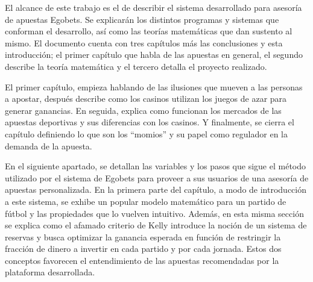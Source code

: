 El alcance de este trabajo es el de describir el sistema desarrollado para asesoría de apuestas Egobets. %
Se explicarán los distintos programas y sistemas que conforman el desarrollo, así como las teorías matemáticas que dan sustento al mismo. El documento cuenta con tres capítulos más las conclusiones y esta introducción; el primer capítulo que habla de las apuestas en general, el segundo describe la teoría matemática y el tercero detalla el proyecto realizado.

El primer capítulo, empieza hablando de las ilusiones que mueven a las personas a apostar, después describe como los casinos utilizan los juegos de azar para generar ganancias. En seguida, explica como funcionan los mercados de las apuestas deportivas y sus diferencias con los casinos. Y finalmente, se cierra el capítulo definiendo lo que son los ``momios'' y su papel como regulador en la demanda de la apuesta. 



En el siguiente apartado, se detallan las variables y los pasos que sigue el método utilizado por el sistema de Egobets para proveer a sus usuarios de una asesoría de apuestas personalizada. En la primera parte del capítulo, a modo de introducción a este sistema, se exhibe un popular modelo matemático para un partido de fútbol y las propiedades que lo vuelven intuitivo. Además, en esta misma sección se explica como el afamado criterio de Kelly introduce la noción de un sistema de reservas y busca optimizar la ganancia esperada en función de restringir la fracción de dinero a invertir en cada partido y por cada jornada. Estos dos conceptos favorecen el entendimiento de las apuestas recomendadas por la plataforma desarrollada.




